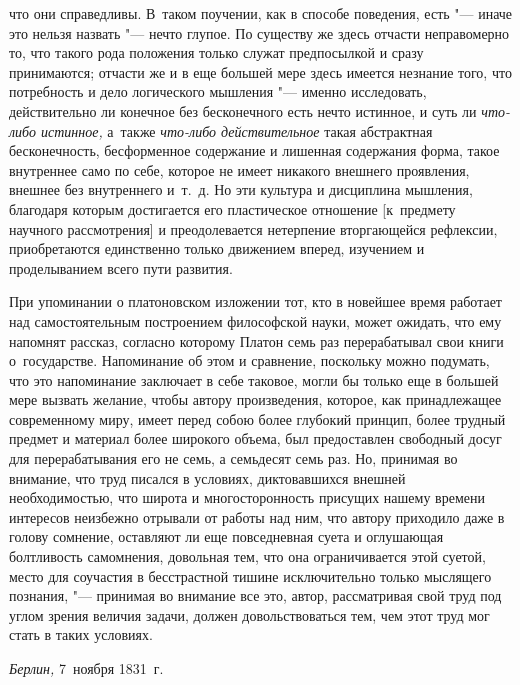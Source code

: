 что они справедливы. В~таком поучении, как в способе поведения, есть
"--- иначе это нельзя назвать "--- нечто глупое. По существу же здесь
отчасти неправомерно то, что такого рода положения только служат предпосылкой
и сразу принимаются; отчасти же и в еще большей мере здесь имеется
незнание того, что потребность и дело логического мышления "--- именно
исследовать, действительно ли конечное без бесконечного есть нечто
истинное, и суть ли {\em что-либо истинное,} а~также
{\em что-либо действительное} такая абстрактная бесконечность, бесформенное
содержание и лишенная содержания форма, такое внутреннее само по себе, которое не
имеет никакого внешнего проявления, внешнее без внутреннего и~т.~д. Но эти культура и дисциплина
мышления, благодаря которым достигается его пластическое отношение [к~предмету
научного рассмотрения] и преодолевается нетерпение вторгающейся рефлексии,
приобретаются единственно только движением вперед, изучением и проделыванием
всего пути развития.

При упоминании о платоновском изложении тот, кто в новейшее время работает над
самостоятельным построением философской науки, может ожидать, что ему напомнят
рассказ, согласно которому Платон семь раз перерабатывал свои книги
о~государстве. Напоминание об этом и сравнение, поскольку можно подумать, что
это напоминание заключает в себе таковое, могли бы только еще в большей мере
вызвать желание, чтобы автору произведения, которое, как принадлежащее
современному миру, имеет перед собою более глубокий принцип, более трудный
предмет и материал более широкого объема, был предоставлен свободный досуг для
перерабатывания его не семь, а семьдесят семь раз. Но, принимая во внимание,
что труд писался в условиях, диктовавшихся внешней необходимостью, что широта и
многосторонность присущих нашему времени интересов неизбежно отрывали от работы над ним,
что автору приходило даже в голову сомнение, оставляют ли еще повседневная
суета и оглушающая болтливость самомнения, довольная тем, что она
ограничивается этой суетой, место для соучастия в бесстрастной
тишине исключительно только мыслящего познания, "--- принимая во внимание
все это, автор, рассматривая свой труд под углом зрения величия задачи, должен
довольствоваться тем, чем этот труд мог стать в таких условиях.

{\em Берлин,} 7~ноября 1831~г.

\bigskip
